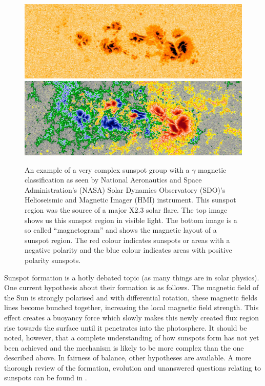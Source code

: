 	\begin{figure}
		\centering
		\includegraphics[width=\textwidth]{sunspot.jpg}\\
		\includegraphics[width=\textwidth]{sunspot_magnetic.jpg}\\
		\caption{
				 An example of a very complex sunspot group with a $\gamma$ magnetic classification as seen by National Aeronautics and Space Administration's (NASA) Solar Dynamics Observatory (SDO)'s Helioseismic and Magnetic Imager (HMI) instrument.
				 This sunspot region was the source of a major X2.3 solar flare.
				 The top image shows us this sunspot region in visible light.
				 The bottom image is a so called ``magnetogram'' and shows the magnetic layout of a sunspot region.
				 The red colour indicates sunspots or areas with a negative polarity and the blue colour indicates areas with positive polarity sunspots.	
				}
		\label{fig:AR_Mag}
	\end{figure}

\cite{lrsp-2011-3}
\cite{2011IAUS..273....8R}

    Sunspot formation is a hotly debated topic (as many things are in solar physics).
    One current hypothesis about their formation is as follows.
    The magnetic field of the Sun is strongly polarised and with differential rotation, these magnetic fields lines become bunched together, increasing the local magnetic field strength.
    This effect creates a buoyancy force which slowly makes this newly created flux region rise towards the surface until it penetrates into the photosphere.
    It should be noted, however, that a complete understanding of how sunspots form has not yet been achieved and the mechanism is likely to be more complex than the one described above.
    In fairness of balance, other hypotheses are available.
    A more thorough review of the formation, evolution and unanswered questions relating to sunspots can be found in \cite{SAO}.

